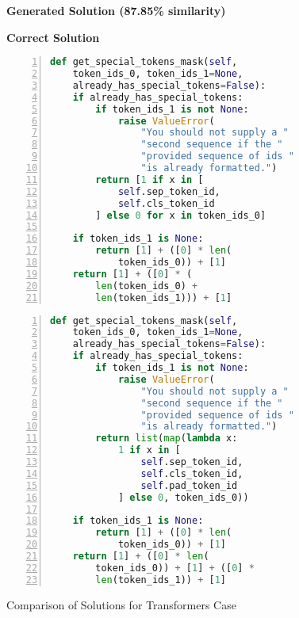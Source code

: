\documentclass{article}
\begin{document}
\begin{figure}[htbp]
\begin{center}
\begin{minipage}{0.48\textwidth}
\centering
\textbf{Generated Solution (87.85\% similarity)}
\end{minipage}%
\hfill%
\begin{minipage}{0.48\textwidth}
\centering
\textbf{Correct Solution}
\end{minipage}

\vspace{0.5em}

\begin{minipage}{0.48\textwidth}
\begin{lstlisting}[language=Python,numbers=left]
def get_special_tokens_mask(self, 
    token_ids_0, token_ids_1=None, 
    already_has_special_tokens=False):
    if already_has_special_tokens:
        if token_ids_1 is not None:
            raise ValueError(
                "You should not supply a "
                "second sequence if the "
                "provided sequence of ids "
                "is already formatted.")
        return [1 if x in [
            self.sep_token_id, 
            self.cls_token_id
        ] else 0 for x in token_ids_0]

    if token_ids_1 is None:
        return [1] + ([0] * len(
            token_ids_0)) + [1]
    return [1] + ([0] * (
        len(token_ids_0) + 
        len(token_ids_1))) + [1]
\end{lstlisting}
\end{minipage}%
\hfill%
\begin{minipage}{0.48\textwidth}
\begin{lstlisting}[language=Python,numbers=left]
def get_special_tokens_mask(self, 
    token_ids_0, token_ids_1=None, 
    already_has_special_tokens=False):
    if already_has_special_tokens:
        if token_ids_1 is not None:
            raise ValueError(
                "You should not supply a "
                "second sequence if the "
                "provided sequence of ids "
                "is already formatted.")
        return list(map(lambda x: 
            1 if x in [
                self.sep_token_id,
                self.cls_token_id,
                self.pad_token_id
            ] else 0, token_ids_0))

    if token_ids_1 is None:
        return [1] + ([0] * len(
            token_ids_0)) + [1]
    return [1] + ([0] * len(
        token_ids_0)) + [1] + ([0] * 
        len(token_ids_1)) + [1]
\end{lstlisting}
\end{minipage}
\end{center}
\caption{Comparison of Solutions for Transformers Case}
\end{figure}
\end{document}
